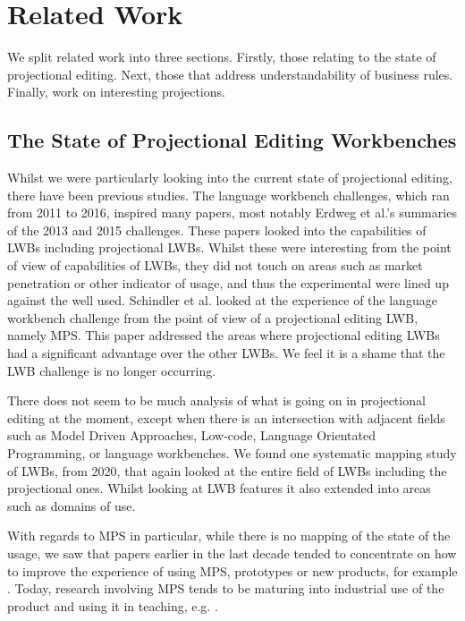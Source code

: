 \chapter{Related Work}\label{chapter:RelatedWork}
We split related work into three sections. 
Firstly, those relating to the state of projectional editing.
Next, those that address understandability of business rules.
Finally, work on interesting projections.

\section{The State of Projectional Editing Workbenches}

Whilst we were particularly looking into the current state of projectional editing, there have been previous studies.
The language workbench challenges, which ran from 2011 to 2016, inspired many papers, most notably Erdweg et al.'s summaries of the 2013\cite{erdweg2013state} and 2015\cite{erdweg2015evaluating} challenges.
These papers looked into the capabilities of LWBs including projectional LWBs.
Whilst these were interesting from the point of view of capabilities of LWBs, they did not touch on areas such as market penetration or other indicator of usage, and thus the experimental were lined up against the well used.
Schindler et al.\cite{schindler2016language} looked at the experience of the language workbench challenge from the point of view of a projectional editing LWB, namely MPS.
This paper addressed the areas where projectional editing LWBs had a significant advantage over the other LWBs. 
We feel it is a shame that the LWB challenge is no longer occurring.

There does not seem to be much analysis of what is going on in projectional editing at the moment, except when there is an intersection with adjacent fields such as Model Driven Approaches, Low-code, Language Orientated Programming, or language workbenches.
We found one systematic mapping study of LWBs\cite{iung2020systematic}, from 2020, that again looked at the entire field of LWBs including the projectional ones.
Whilst looking at LWB features it also extended into areas such as domains of use.

With regards to MPS in particular, while there is no mapping of the state of the usage, we saw that papers earlier in the last decade tended to concentrate on how to improve the experience of using MPS, prototypes or new products, for example \cite{pavletic2013extensible,voelter2014generic,voelter2015using,voelter2010language2,voelter2013mbeddr,voelter2013requirements,voelter2014projecting,voelter2015towards,voelter2010embedded,voelter2011product,ratiu2012implementing}.
Today, research involving MPS tends to be maturing into industrial use of the product and using it in teaching, e.g. \cite{prinz2021teaching,voelterdomain_SLR, schindler2021jetbrains_SLR,simi2021learning_SLR,barash2021teaching_SLR,stotz2021migrating_SLR,ratiu2021use}.

